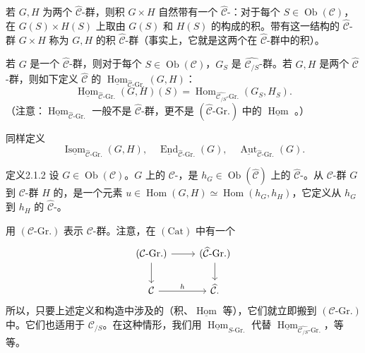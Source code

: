 若 $G,H$ 为两个 $\widehat{\mathcal C}$-群，则积 $G\times H$ 自然带有一个 $\widehat{\mathcal C}$-：对于每个 $S\in\operatorname{Ob}(\mathcal C)$，在 $G(S)\times H(S)$ 上取由 $G(S)$ 和 $H(S)$ 的构成的积。带有这一结构的 $\widehat{\mathcal C}$-群 $G\times H$ 称为 $G,H$ 的积 $\widehat{\mathcal C}$-群（事实上，它就是这两个在 $\widehat{\mathcal C}$-群中的积）。

若 $G$ 是一个 $\widehat{\mathcal C}$-群，则对于每个 $S\in\operatorname{Ob}(\mathcal C)$，$G_S$ 是 $\widehat{\mathcal C_{/S}}$-群。若 $G,H$ 是两个 $\widehat{\mathcal C}$-群，则如下定义 $\widehat{\mathcal C}$ 的 $\underline{\operatorname{Hom}}_{\widehat{\mathcal C}\text{-}\mathrm{Gr.}}(G,H)$：
\[
\underline{\operatorname{Hom}}_{\widehat{\mathcal C}\text{-}\mathrm{Gr.}}(G,H)(S)
=\operatorname{Hom}_{\widehat{\mathcal C_{/S}}\text{-}\mathrm{Gr.}}(G_S,H_S).
\]
（注意：$\underline{\operatorname{Hom}}_{\widehat{\mathcal C}\text{-}\mathrm{Gr.}}$ 一般不是 $\widehat{\mathcal C}$-群，更不是 $(\widehat{\mathcal C}\text{-}\mathrm{Gr.})$ 中的 $\underline{\operatorname{Hom}}$ 。）

同样定义
\[
\underline{\operatorname{Isom}}_{\widehat{\mathcal C}\text{-}\mathrm{Gr.}}(G,H),\quad
\underline{\operatorname{End}}_{\widehat{\mathcal C}\text{-}\mathrm{Gr.}}(G),\quad
\underline{\operatorname{Aut}}_{\widehat{\mathcal C}\text{-}\mathrm{Gr.}}(G).
\]
\begin{SGAresult}{定义}{2.1.2}
设 $G\in\operatorname{Ob}(\mathcal C)$。$G$ 上的 $\mathcal C$-，是 $h_G\in\operatorname{Ob}(\widehat{\mathcal C})$ 上的 $\widehat{\mathcal C}$-。从 $\mathcal C$-群 $G$ 到 $\mathcal C$-群 $H$ 的，是一个元素 $u\in\operatorname{Hom}(G,H)\simeq\operatorname{Hom}(h_G,h_H)$，它定义从 $h_G$ 到 $h_H$ 的 $\widehat{\mathcal C}$-。
\end{SGAresult}
用 $(\mathcal C\text{-}\mathrm{Gr.})$ 表示 $\mathcal C$-群。注意，在 $(\mathrm{Cat})$ 中有一个
\[
\begin{tikzcd}
(\mathcal C\text{-}\mathrm{Gr.})\arrow[r]\arrow[d]&(\widehat{\mathcal C}\text{-}\mathrm{Gr.})\arrow[d]\\
\mathcal C\arrow[r,"h"]&\widehat{\mathcal C}.
\end{tikzcd}
\]
所以，只要上述定义和构造中涉及的（积、$\underline{\operatorname{Hom}}$ 等），它们就立即搬到 $(\mathcal C\text{-}\mathrm{Gr.})$ 中。它们也适用于 $\mathcal C_{/S}$。在这种情形，我们用 $\underline{\operatorname{Hom}}_{S\text{-}\mathrm{Gr.}}$ 代替 $\underline{\operatorname{Hom}}_{\widehat{\mathcal C_{/S}}\text{-}\mathrm{Gr.}}$，等等。

